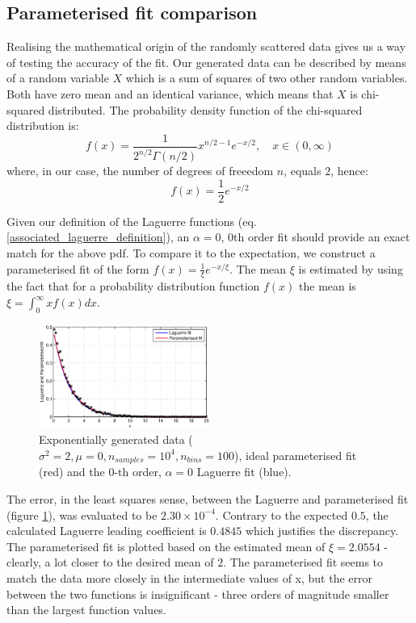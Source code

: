 \documentclass[a4paper]{article}
\numberwithin{equation}{section}
\begin{document}
\subsection{Parameterised fit comparison}
Realising the mathematical origin of the randomly scattered data gives us a way of testing the accuracy of the fit. Our generated data can be described by means of a random variable $X$ which is a sum of squares of two other random variables. Both have zero mean and an identical variance, which means that $X$ is chi-squared distributed. The probability density function of the chi-squared distribution is:
\begin{equation}
f(x) = \frac{1}{2^{n/2} \Gamma(n/2)}x^{n/2-1} e^{-x/2}, \quad x \in (0, \infty)
\end{equation}
where, in our case, the number of degrees of freeedom $n$, equals $2$, hence:
\begin{equation}
f(x) = \frac{1}{2} e^{-x/2}
\end{equation}

\noindent Given our definition of the Laguerre functions (eq. \ref{associated_laguerre_definition}), an $\alpha = 0$, 0th order fit should provide an exact match for the above pdf. To compare it to the expectation, we construct a parameterised fit of the form $f(x) = \frac{1}{\xi} e^{-x/\xi}$. The mean $\xi$ is estimated by using the fact that for a probability distribution function $f(x)$ the mean is $\xi = \int_{0}^{\infty} xf(x) dx$. \\

\begin{figure}[!h]
\centering
\includegraphics[width=0.5\textwidth]{laguerre_parameterised_fit.eps}
\caption{\label{fig:laguerreparemeterisedfit}Exponentially generated data ($\sigma^2=2, \mu=0, n_{samples}=10^4, n_{bins}=100$), ideal parameterised fit (red) and the 0-th order, $\alpha=0$ Laguerre fit (blue).}
\end{figure}

\noindent The error, in the least squares sense, between the Laguerre and parameterised fit (figure \ref{fig:laguerreparemeterisedfit}), was evaluated to be $2.30 \times 10^{-4}$. Contrary to the expected $0.5$, the calculated Laguerre leading coefficient is $0.4845$ which justifies the discrepancy. The parameterised fit is plotted based on the estimated mean of $\xi=2.0554$ - clearly, a lot closer to the desired mean of $2$. The parameterised fit seems to match the data more closely in the intermediate values of x, but the error between the two functions is insignificant - three orders of magnitude smaller than the largest function values.  
\end{document}
